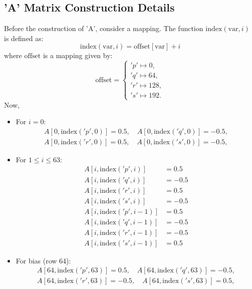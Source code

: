 \documentclass[11pt]{article}
\begin{document}
\subsection*{'A' Matrix Construction Details}
Before the construction of 'A', consider a mapping. The function \(\mathrm{index}(\mathrm{var}, i)\) is defined as:
\[
\mathrm{index}(\mathrm{var}, i) = \mathrm{offset}[\mathrm{var}] + i
\]
where \(\mathrm{offset}\) is a mapping given by:
\[
\mathrm{offset} = \begin{cases}
    'p' \mapsto 0, \\
    'q' \mapsto 64, \\
    'r' \mapsto 128, \\
    's' \mapsto 192.
\end{cases}
\]
Now,
\begin{itemize}
\item For $i=0$:
\begin{gather*}
A[0, \text{index}('p',0)] = 0.5,\quad A[0, \text{index}('q',0)] = -0.5,\\
A[0, \text{index}('r',0)] = 0.5,\quad A[0, \text{index}('s',0)] = -0.5,
\end{gather*}

\item For $1 \leq i \leq 63$:
\begin{equation*}
\begin{aligned}
A[i, \text{index}('p',i)] &= 0.5 \\ 
A[i, \text{index}('q',i)] &= -0.5 \\ 
A[i, \text{index}('r',i)] &= 0.5 \\ 
A[i, \text{index}('s',i)] &= -0.5 \\ 
A[i, \text{index}('p',i-1)] &= 0.5 \\ 
A[i, \text{index}('q',i-1)] &= -0.5 \\ 
A[i, \text{index}('r',i-1)] &= -0.5 \\ 
A[i, \text{index}('s',i-1)] &= 0.5
\end{aligned}
\end{equation*}

\item For bias (row 64):
\begin{gather*}
A[64, \text{index}('p',63)] = 0.5,\quad A[64, \text{index}('q',63)] = -0.5,\\
A[64, \text{index}('r',63)] = -0.5,\quad A[64, \text{index}('s',63)] = 0.5,
\end{gather*}
\end{itemize}
\end{document}
